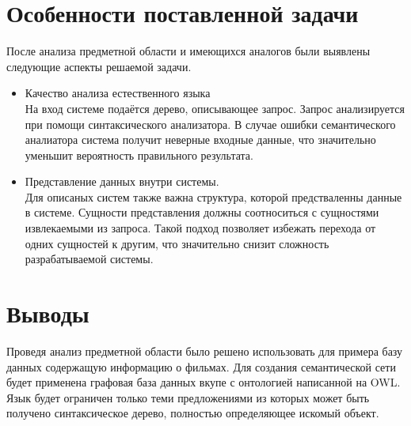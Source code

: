 \section{Особенности поставленной задачи}
После анализа предметной области и имеющихся аналогов были выявлены следующие аспекты решаемой задачи. 
\begin{itemize}
\item Качество анализа естественного языка \\
На вход системе подаётся дерево, описывающее запрос. Запрос анализируется при помощи синтаксического анализатора. В случае ошибки семантического аналиатора система получит неверные входные данные, что значительно уменьшит вероятность правильного результата. 
\item Представление данных внутри системы.\\
Для описаных систем также важна структура, которой предстваленны данные в системе. Сущности представления должны соотноситься с сущностями извлекаемыми из запроса. Такой подход позволяет избежать перехода от одних сущностей к другим, что значительно снизит сложность разрабатываемой системы.
\end{itemize}
\section{Выводы}
Проведя анализ предметной области было решено использовать для примера базу данных содержащую информацию о фильмах. Для создания семантической сети будет применена графовая база данных вкупе с онтологией написанной на OWL. Язык будет ограничен только теми предложениями из которых может быть получено синтаксическое дерево, полностью определяющее искомый объект.

